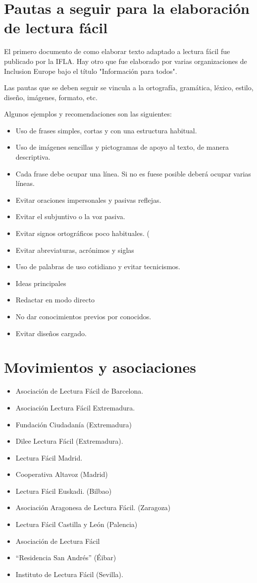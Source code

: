 \section{Pautas a seguir para la elaboración de lectura fácil}
 El primero documento de como elaborar texto adaptado a lectura fácil fue publicado por la IFLA. Hay otro que fue elaborado por varias organizaciones de Inclusion Europe bajo el título "Información para todos". 
 
 Las pautas que se deben seguir se vincula a la ortografía, gramática, léxico, estilo, diseño, imágenes, formato, etc. 
 
 Algunos ejemplos y recomendaciones son las siguientes:
 \begin{itemize}
 \item Uso de frases simples, cortas y con una estructura habitual.
 \item Uso de imágenes sencillas y pictogramas de apoyo al texto, de manera descriptiva.
 \item Cada frase debe ocupar una línea. Si no es fuese posible deberá ocupar varias líneas.
 \item Evitar oraciones impersonales y pasivas reflejas.
 \item Evitar el subjuntivo o la voz pasiva.
 \item Evitar signos ortográficos poco habituales. (%
 \item Evitar abreviaturas, acrónimos y siglas
 \item Uso de palabras de uso cotidiano y evitar tecnicismos.
 \item Ideas principales
 \item Redactar en modo directo
 \item No dar conocimientos previos por conocidos.
 \item Evitar diseños cargado.​
\end{itemize}
\section{Movimientos y asociaciones}
\begin{itemize}
	\item Asociación de Lectura Fácil de Barcelona.
	\item Asociación Lectura Fácil Extremadura.
	\item Fundación Ciudadanía (Extremadura)
	\item Dilee Lectura Fácil (Extremadura).
	\item Lectura Fácil Madrid.
	\item Cooperativa Altavoz (Madrid)
	\item Lectura Fácil Euskadi. (Bilbao)
	\item Asociación Aragonesa de Lectura Fácil. (Zaragoza)
	\item Lectura Fácil Castilla y León (Palencia)
	\item Asociación de Lectura Fácil \item “Residencia San Andrés” (Éibar)
	\item Instituto de Lectura Fácil (Sevilla).
\end{itemize}

